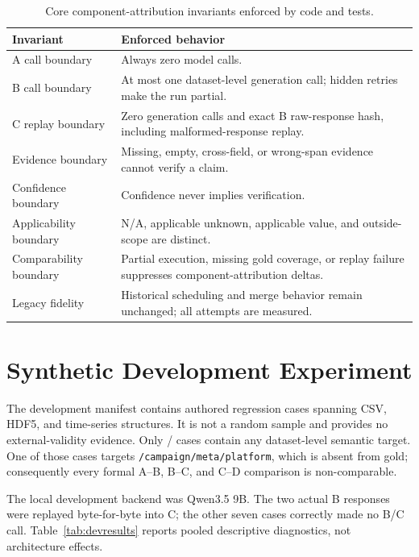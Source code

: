 \documentclass[11pt]{article}
\newcommand{\NA}{\textsf{N/A}}
\begin{document}
\begin{table}[H]
\centering
\caption{Core component-attribution invariants enforced by code and tests.}
\begin{tabularx}{\textwidth}{@{}p{4.2cm}Y@{}}
\toprule
Invariant & Enforced behavior \\
\midrule
A call boundary & Always zero model calls. \\
B call boundary & At most one dataset-level generation call; hidden retries make the run partial. \\
C replay boundary & Zero generation calls and exact B raw-response hash, including malformed-response replay. \\
Evidence boundary & Missing, empty, cross-field, or wrong-span evidence cannot verify a claim. \\
Confidence boundary & Confidence never implies verification. \\
Applicability boundary & \NA, applicable unknown, applicable value, and outside-scope are distinct. \\
Comparability boundary & Partial execution, missing gold coverage, or replay failure suppresses component-attribution deltas. \\
Legacy fidelity & Historical scheduling and merge behavior remain unchanged; all attempts are measured. \\
\bottomrule
\end{tabularx}
\end{table}

\section{Synthetic Development Experiment}

The development manifest contains \DevCases{} authored regression cases spanning
CSV, HDF5, and time-series structures. It is not a random sample and provides no
external-validity evidence. Only \DevSemanticCases{}/\DevCases{} cases contain any
dataset-level semantic target. One of those cases targets
\texttt{/campaign/meta/platform}, which is absent from gold; consequently every
formal A--B, B--C, and C--D comparison is non-comparable.

The local development backend was Qwen3.5 9B. The two actual B responses were
replayed byte-for-byte into C; the other seven cases correctly made no B/C call.
Table~\ref{tab:devresults} reports pooled descriptive diagnostics, not architecture
effects.
\end{document}
